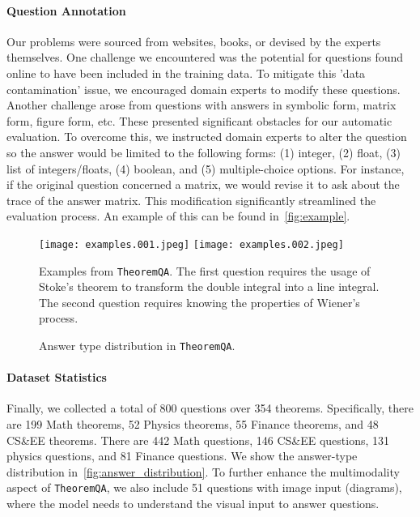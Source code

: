 \documentclass[11pt]{article}
\newcommand{\dataset}{\texttt{TheoremQA}\xspace}
\begin{document}
\paragraph{Question Annotation}
Our problems were sourced from websites, books, or devised by the experts themselves. One challenge we encountered was the potential for questions found online to have been included in the training data. To mitigate this 'data contamination' issue, we encouraged domain experts to modify these questions. Another challenge arose from questions with answers in symbolic form, matrix form, figure form, etc. These presented significant obstacles for our automatic evaluation. To overcome this, we instructed domain experts to alter the question so the answer would be limited to the following forms: (1) integer, (2) float, (3) list of integers/floats, (4) boolean, and (5) multiple-choice options. For instance, if the original question concerned a matrix, we would revise it to ask about the trace of the answer matrix. This modification significantly streamlined the evaluation process. An example of this can be found in~\autoref{fig:example}.

\begin{figure}[!t]
    \centering
    \texttt{[image: examples.001.jpeg]}
\texttt{[image: examples.002.jpeg]}
    \caption{Examples from \dataset. The first question requires the usage of Stoke's theorem to transform the double integral into a line integral. The second question requires knowing the properties of Wiener's process.}
    \label{fig:example}    
\end{figure}



\begin{figure}
    \centering
    \clearpage{}\clearpage{}
    \vspace{-6ex}
    \caption{Answer type distribution in \dataset.}
    \label{fig:answer_distribution}
\end{figure}

\paragraph{Dataset Statistics}
Finally, we collected a total of 800 questions over 354 theorems. Specifically, there are 199 Math theorems, 52 Physics theorems, 55 Finance theorems, and 48 CS\&EE theorems. There are 442 Math questions, 146 CS\&EE questions, 131 physics questions, and 81 Finance questions. We show the answer-type distribution in~\autoref{fig:answer_distribution}. To further enhance the multimodality aspect of \dataset, we also include 51 questions with image input (diagrams), where the model needs to understand the visual input to answer questions. 
\end{document}
